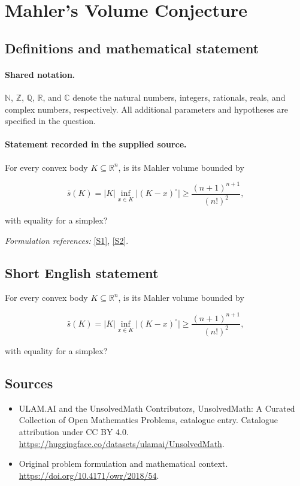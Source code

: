 \documentclass[11pt]{article}
\newcommand{\sref}[2]{\hyperlink{source:#1:#2}{[S#2]}}
\begin{document}
\section{Mahler’s Volume Conjecture}\label{statement}

\subsection{Definitions and mathematical statement}

\paragraph{Shared notation.}$\mathbb N$, $\mathbb Z$, $\mathbb Q$, $\mathbb R$, and $\mathbb C$ denote the natural numbers, integers, rationals, reals, and complex numbers, respectively. All additional parameters and hypotheses are specified in the question.


\paragraph{Statement recorded in the supplied source.}
For every convex body $K\subseteq\mathbb R^n$, is its Mahler volume bounded by

$$\bar s(K)=\lvert K\rvert\inf_{x\in K}\lvert(K-x)^\circ\rvert\geq\frac{(n+1)^{n+1}}{(n!)^2},$$

with equality for a simplex?
\par\smallskip\textit{Formulation references:} \sref{statement}{1}, \sref{statement}{2}.
\subsection{Short English statement}
For every convex body $K\subseteq\mathbb R^n$, is its Mahler volume bounded by

$$\bar s(K)=\lvert K\rvert\inf_{x\in K}\lvert(K-x)^\circ\rvert\geq\frac{(n+1)^{n+1}}{(n!)^2},$$

with equality for a simplex?
\subsection{Sources}
\begin{itemize}
\item[\hypertarget{source:statement:1}{S1}] ULAM.AI and the UnsolvedMath Contributors, UnsolvedMath: A Curated Collection of Open Mathematics Problems, catalogue entry. Catalogue attribution under CC BY 4.0.
\url{https://huggingface.co/datasets/ulamai/UnsolvedMath}.
\item[\hypertarget{source:statement:2}{S2}] Original problem formulation and mathematical context.
\url{https://doi.org/10.4171/owr/2018/54}.
\end{itemize}
\label{end:statement}
\end{document}
